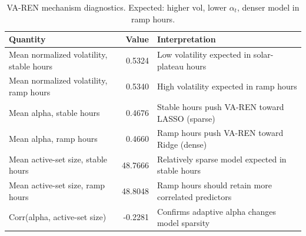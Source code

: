 \begin{table}[t]\centering
\caption{VA-REN mechanism diagnostics. Expected: higher vol, lower $\alpha_t$, denser model in ramp hours.}
\label{tab:varen_mechanism}
\begin{tabular}{@{}lrp{6cm}@{}}\toprule
Quantity & Value & Interpretation\\\midrule
Mean normalized volatility, stable hours & 0.5324 & Low volatility expected in solar-plateau hours\\
Mean normalized volatility, ramp hours & 0.5340 & High volatility expected in ramp hours\\
Mean alpha, stable hours & 0.4676 & Stable hours push VA-REN toward LASSO (sparse)\\
Mean alpha, ramp hours & 0.4660 & Ramp hours push VA-REN toward Ridge (dense)\\
Mean active-set size, stable hours & 48.7666 & Relatively sparse model expected in stable hours\\
Mean active-set size, ramp hours & 48.8048 & Ramp hours should retain more correlated predictors\\
Corr(alpha, active-set size) & -0.2281 & Confirms adaptive alpha changes model sparsity\\
\bottomrule\end{tabular}\end{table}
